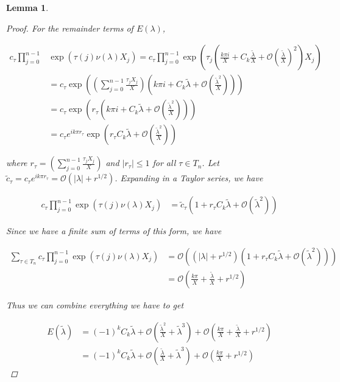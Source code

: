 \documentclass[12pt]{article}
\newtheorem{lemma}{Lemma}
\begin{document}
\begin{lemma}
\begin{proof}
For the remainder terms of $E(\lambda)$,

\begin{align*}
c_\tau \prod_{j = 0}^{n-1} &\exp\left( {\tau(j) \nu(\lambda)X_j} \right)
= c_\tau \prod_{j = 0}^{n-1} 
\exp\left( \tau_j \left( \frac{k \pi i}{X} + C_k \frac{\tilde{\lambda}}{X} + \mathcal{O}\left( \frac{\tilde{\lambda}}{X}\right)^2 \right) X_j\right) \\
&= c_\tau \exp\left( \left( \sum_{j=0}^{n-1} \frac{\tau_j X_j}{X} \right)
\left( k \pi i + C_k \tilde{\lambda} + \mathcal{O}\left( \frac{\tilde{\lambda}^2}{X} \right) \right) \right) \\
&= c_\tau \exp\left( r_\tau
\left( k \pi i + C_k \tilde{\lambda} + \mathcal{O}\left( \frac{\tilde{\lambda}^2}{X} \right) \right) \right) \\ 
&= c_\tau e^{i k \pi r_\tau} \exp \left( r_\tau C_k \tilde{\lambda} + \mathcal{O}\left( \frac{\tilde{\lambda}^2}{X} \right) \right)
\end{align*}

where $r_\tau = \left( \sum_{j=0}^{n-1} \frac{\tau_j X_j}{X} \right)$ and $|r_\tau| \leq 1$ for all $\tau \in T_n$. Let $\tilde{c}_\tau = c_\tau e^{i k \pi r_\tau} = \mathcal{O}(|\lambda| + r^{1/2})$. Expanding in a Taylor series, we have

\begin{align*}
c_\tau \prod_{j = 0}^{n-1} \exp\left( {\tau(j) \nu(\lambda)X_j} \right)
&= \tilde{c}_\tau \left( 1 + r_\tau C_k \tilde{\lambda} + \mathcal{O}\left(\tilde{\lambda}^2 \right) \right) 
\end{align*}

Since we have a finite sum of terms of this form, we have

\begin{align*}
\sum_{\tau \in T_n} c_\tau \prod_{j = 0}^{n-1} \exp\left( {\tau(j) \nu(\lambda)X_j} \right)
&= \mathcal{O}\left( (|\lambda| + r^{1/2}) \left( 1 + r_\tau C_k \tilde{\lambda} + \mathcal{O}\left(\tilde{\lambda}^2 \right) \right)\right) \\
&= \mathcal{O} \left( \frac{k \pi}{X} + \frac{\tilde{\lambda}}{X} + r^{1/2} \right)
\end{align*}

Thus we can combine everything we have to get

\begin{align*}
E(\tilde{\lambda})
&= (-1)^k C_k \tilde{\lambda} + \mathcal{O}\left( \frac{\tilde{\lambda}^2}{X} + \tilde{\lambda}^3 \right) + \mathcal{O} \left( \frac{k \pi}{X} + \frac{\tilde{\lambda}}{X} + r^{1/2} \right) \\
&= (-1)^k C_k \tilde{\lambda} + \mathcal{O}\left( \frac{\tilde{\lambda}}{X} + \tilde{\lambda}^3 \right) + \mathcal{O} \left( \frac{k \pi}{X} + r^{1/2} \right)
\end{align*}


\end{proof}
\end{lemma}
\end{document}
